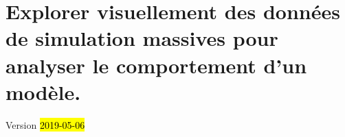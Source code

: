 \chapter{Explorer visuellement des données de simulation massives pour analyser le comportement d'un modèle.}
\label{chap:chap5}
\begin{center}
{\large Version \hl{2019-05-06}}

\end{center}
\minitoc

%

%
%
%
%



\printbibliography[title={Références}]
